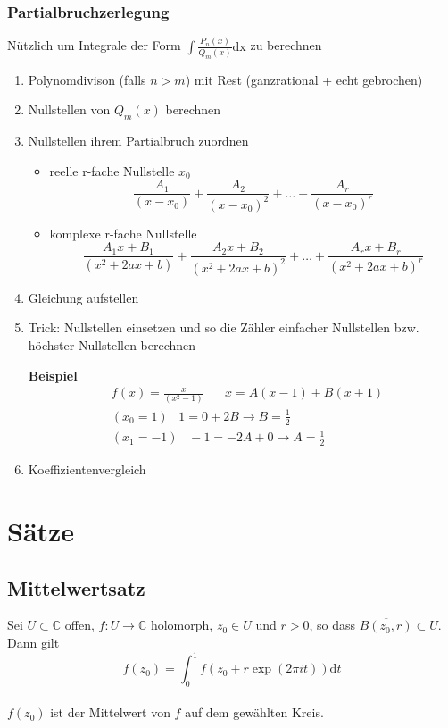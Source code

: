\documentclass[8pt, a4paper, landscape, fleqn]{scrartcl}
\newenvironment {example}
				{\begin{itshape} \begin{small}}
				{\end{small} \end{itshape}}
\def\C{\mathbb{C}}
\def\d{\text{d}}
\begin{document}
\begin{multicols*}{3}
		\subsubsection{Partialbruchzerlegung}
				Nützlich um Integrale der Form $\int \frac{P_n(x)}{Q_m(x)} \text{dx}$ zu berechnen
				\begin{enumerate}
					\item Polynomdivison (falls $n > m$) mit Rest (ganzrational + echt gebrochen)
					\item Nullstellen von $Q_m(x)$ berechnen
					\item Nullstellen ihrem Partialbruch zuordnen
					\begin{itemize}
						\item reelle r-fache Nullstelle $x_0$
						\[\frac{A_1}{(x-x_0)} + \frac{A_2}{(x-x_0)^2} + \ldots + \frac{A_r}{(x-x_0)^r}\]
						\item  komplexe r-fache Nullstelle
						\[\frac{A_1x + B_1}{(x^2+2ax+b)} + \frac{A_2x + B_2}{(x^2+2ax+b)^2} + \ldots + \frac{A_rx + B_r}{(x^2+2ax+b)^r}\]
					\end{itemize}
					\item Gleichung aufstellen
					\item Trick: Nullstellen einsetzen und so die Zähler einfacher Nullstellen bzw. höchster Nullstellen berechnen\\[3pt]						
					\begin{example}
						\textbf{Beispiel}
						\begin{align*}
						&f(x)=\frac{x}{(x^2-1)} \hspace{20pt}x = A(x-1) + B(x+1)\\
						&(x_0=1) \hspace{10pt} 1=0 + 2B \rightarrow B = \frac{1}{2}\\ &(x_1=-1) \hspace{10pt} -1=-2A + 0 \rightarrow A = \frac{1}{2}
						\end{align*}
					\end{example}
					\item Koeffizientenvergleich

			\end{enumerate}
		
		\section{Sätze}
        \subsection{Mittelwertsatz}
        Sei $U \subset \C$ offen, $f : U \to \C$ holomorph, $z_0 \in U$ und $r > 0$, so dass $\overline{B(z_0, r)} \subset U$. Dann gilt $$ f(z_0) = \int_0^1 f(z_0 + r\exp(2\pi i t)) \d t$$ \\
        $f(z_0)$ ist der Mittelwert von $f$ auf dem gewählten Kreis.
        

\end{multicols*}
\end{document}
